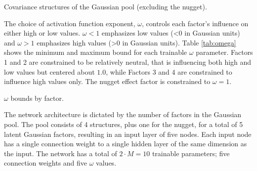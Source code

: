 
\begin{table}[!htb]
    \centering
    \caption{Covariance structures of the Gaussian pool (excluding the nugget).}
    \resizebox{0.9\width}{!}{}
    \label{tab:pool}
\end{table}

The choice of activation function exponent, $\omega$, controls each factor's influence on either high or low values. $\omega < 1$ emphasizes low values (<0 in Gaussian units) and $\omega > 1$ emphasizes high values (>0 in Gaussian units). Table \ref{tab:omega} shows the minimum and maximum bound for each trainable $\omega$ parameter. Factors 1 and 2 are constrained to be relatively neutral, that is influencing both high and low values but centered about $1.0$, while Factors 3 and 4 are constrained to influence high values only. The nugget effect factor is constrained to $\omega=1$.

\begin{table}[!htb]
    \centering
    \caption{$\omega$ bounds by factor.}
    \resizebox{0.9\width}{!}{}
    \label{tab:omega}
\end{table}

The network architecture is dictated by the number of factors in the Gaussian pool. The pool consists of 4 structures, plus one for the nugget, for a total of 5 latent Gaussian factors, resulting in an input layer of five nodes. Each input node has a single connection weight to a single hidden layer of the same dimension as the input. The network has a total of $2 \cdot M = 10$ trainable parameters; five connection weights and five $\omega$ values.

